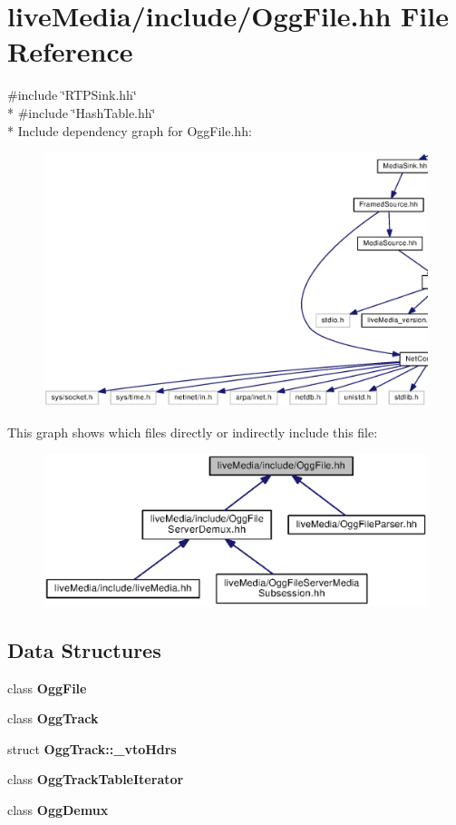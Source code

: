 \section{live\+Media/include/\+Ogg\+File.hh File Reference}
\label{OggFile_8hh}
{\ttfamily \#include \char`\"{}R\+T\+P\+Sink.\+hh\char`\"{}}\\*
{\ttfamily \#include \char`\"{}Hash\+Table.\+hh\char`\"{}}\\*
Include dependency graph for Ogg\+File.\+hh\+:
\nopagebreak
\begin{figure}[H]
\begin{center}
\leavevmode
\includegraphics[width=350pt]{OggFile_8hh__incl}
\end{center}
\end{figure}
This graph shows which files directly or indirectly include this file\+:
\nopagebreak
\begin{figure}[H]
\begin{center}
\leavevmode
\includegraphics[width=350pt]{OggFile_8hh__dep__incl}
\end{center}
\end{figure}
\subsection*{Data Structures}
\begin{DoxyCompactItemize}
\item 
class {\bf Ogg\+File}
\item 
class {\bf Ogg\+Track}
\item 
struct {\bf Ogg\+Track\+::\+\_\+vto\+Hdrs}
\item 
class {\bf Ogg\+Track\+Table\+Iterator}
\item 
class {\bf Ogg\+Demux}
\end{DoxyCompactItemize}
